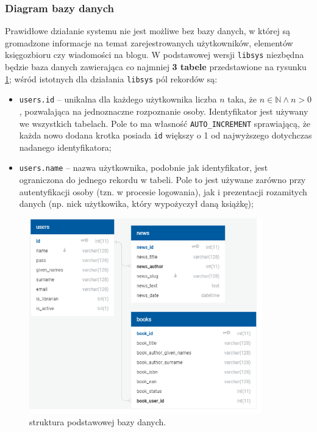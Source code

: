\documentclass[12pt, a4paper]{article}
\begin{document}
\subsubsection{Diagram bazy danych}
Prawidłowe działanie systemu nie jest możliwe bez bazy danych, w której są gromadzone informacje na temat zarejestrowanych użytkowników, elementów księgozbioru czy wiadomości na blogu. W podstawowej wersji \texttt{libsys} niezbędna będzie baza danych zawierająca co najmniej \textbf{3 tabele} przedstawione na rysunku \ref{fig:dbdiagram}; wśród istotnych dla działania \texttt{libsys} pól rekordów są:

\begin{itemize}
    \item \texttt{users.id} -- unikalna dla każdego użytkownika liczba $n$ taka, że $n \in \mathbb{N} \land n > 0$, pozwalająca na jednoznaczne rozpoznanie osoby. Identyfikator jest używany we wszystkich tabelach. Pole to ma własność \texttt{AUTO\_INCREMENT} sprawiającą, że każda nowo dodana krotka posiada \texttt{id} większy o 1 od najwyższego dotychczas nadanego identyfikatora;
    \item \texttt{users.name} -- nazwa użytkownika, podobnie jak identyfikator, jest ograniczona do jednego rekordu w tabeli. Pole to jest używane zarówno przy autentyfikacji osoby (tzn. w procesie logowania), jak i prezentacji rozamitych danych (np. nick użytkowika, który wypożyczył daną książkę);
\end{itemize}

\begin{figure}[h]
    \centering
    \includegraphics[width=0.9\textwidth]{img/diagram_db.png}
    \caption{struktura podstawowej bazy danych.}
    \label{fig:dbdiagram}
\end{figure}
\end{document}
